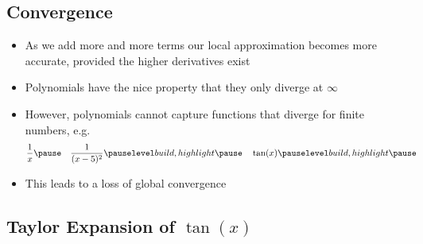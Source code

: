 
\begin{slide}
\section{Convergence}

\begin{PauseHighLight}
  \begin{itemize}
  \item As we add more and more terms our local approximation becomes
    more accurate\pause, provided the higher derivatives exist\pauseb
  \item Polynomials have the nice property that they only diverge at
    $\infty$\pause
  \item However, polynomials cannot capture functions that diverge for
    finite numbers, e.g.
    \begin{align*}
      &\frac{1}{x}\pause &&\frac{1}{(x-5)^2}\pauseb &&\tan(x)\pauseb 
    \end{align*}
  \item This leads to a loss of global convergence\pauseb
  \end{itemize}
\end{PauseHighLight}

\end{slide}


\begin{slide}
\section[-1]{Taylor Expansion of $\tan(x)$}

\pause{}
\pb
\begin{center}
  \pause
\end{center}
\end{slide}


